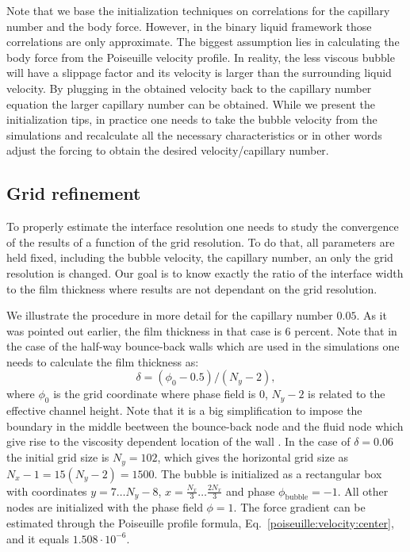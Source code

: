\documentclass{article}
\begin{document}
Note that we base the initialization techniques on correlations for the
capillary number and the body force. However, in the binary liquid framework
those correlations are only approximate. The biggest assumption lies
in calculating the body force from the Poiseuille velocity profile.
In reality, the less viscous bubble will have a slippage
factor and its velocity is larger than the surrounding liquid velocity. By
plugging in the obtained velocity back to the capillary number equation the
larger capillary number can be obtained. While we present the initialization
tips, in practice one needs to take the bubble velocity from the simulations and
recalculate all the necessary characteristics or in other words adjust the
forcing to obtain the desired velocity/capillary number.

\subsection{Grid refinement}
To properly estimate the interface resolution one needs to study the convergence
of the results of a function of the grid resolution. To do that, all parameters are held fixed,
including the bubble velocity, the capillary number, an only the grid
resolution is changed. Our goal is to know exactly the ratio of the interface width to the
film thickness where results are not dependant on the grid resolution.

We illustrate the procedure in more detail for the capillary number
$0.05$. As it was pointed out earlier, the film thickness in that case is $6$ percent.
Note that in the case of the half-way bounce-back walls \cite{yu} which are used in the
simulations one needs to calculate the film thickness as:
\begin{equation}
\delta=(\phi_0-0.5)/(N_y-2),
\end{equation}
where $\phi_0$ is the grid coordinate where phase field is $0$, $N_y-2$
is related to the effective channel height. Note that it is a big
simplification to impose the boundary in the middle beetween the bounce-back
node and the fluid node which give rise to the viscosity dependent location of
the wall \cite{ginzburg-multireflection}. In the case of $\delta=0.06$ the
initial grid size is $N_y=102$, which gives the horizontal grid size as $N_x-1=15(N_y-2)=1500$.
The bubble is initialized as a rectangular box with coordinates
$y=7\dots N_y-8$, $x=\frac{N_x}{3}\dots \frac{2 N_x}{3}$ and phase
$\phi_{\mathrm{bubble}}=-1$. All other nodes are initialized with the phase field
$\phi=1$. The force gradient can be estimated through the Poiseuille
profile formula, Eq.~\ref{poiseuille:velocity:center}, and it equals
$1.508 \cdot 10^{-6}$.
\end{document}
